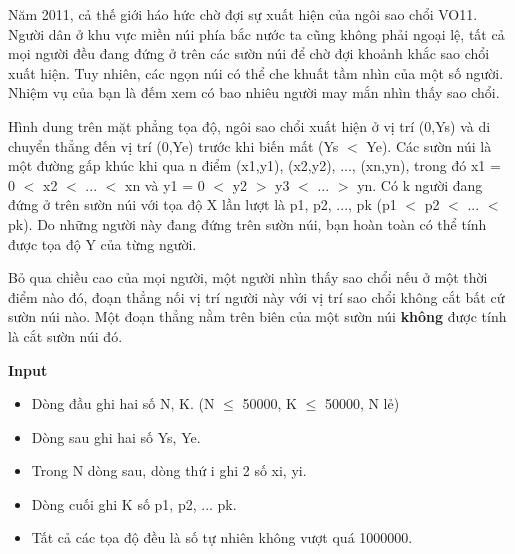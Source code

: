 Năm 2011, cả thế giới háo hức chờ đợi sự xuất hiện của ngôi sao chổi VO11. Người dân ở khu vực miền núi phía bắc nước ta cũng không phải ngoại lệ, tất cả mọi người đều đang đứng ở trên các sườn núi để chờ đợi khoảnh khắc sao chổi xuất hiện. Tuy nhiên, các ngọn núi có thể che khuất tầm nhìn của một số người. Nhiệm vụ của bạn là đếm xem có bao nhiêu người may mắn nhìn thấy sao chổi.

Hình dung trên mặt phẳng tọa độ, ngôi sao chổi xuất hiện ở vị trí (0,Ys) và di chuyển thẳng đến vị trí (0,Ye) trước khi biến mất (Ys $<$ Ye). Các sườn núi là một đường gấp khúc khi qua n điểm (x1,y1), (x2,y2), ..., (xn,yn), trong đó x1 = 0 $<$ x2 $<$ ... $<$ xn và y1 = 0 $<$ y2 $>$ y3 $<$ ... $>$ yn. Có k người đang đứng ở trên sườn núi với tọa độ X lần lượt là p1, p2, ..., pk (p1 $<$ p2 $<$ ... $<$ pk). Do những người này đang đứng trên sườn núi, bạn hoàn toàn có thể tính được tọa độ Y của từng người.

Bỏ qua chiều cao của mọi người, một người nhìn thấy sao chổi nếu ở một thời điểm nào đó, đoạn thẳng nối vị trí người này với vị trí sao chổi không cắt bất cứ sườn núi nào. Một đoạn thẳng nằm trên biên của một sườn núi \textbf{ không } được tính là cắt sườn núi đó.

\textbf{Input }
\begin{itemize}
	\item Dòng đầu ghi hai số N, K. (N  $\le$  50000, K  $\le$  50000, N lẻ)
	\item Dòng sau ghi hai số Ys, Ye.
	\item Trong N dòng sau, dòng thứ i ghi 2 số xi, yi.
	\item Dòng cuối ghi K số p1, p2, ... pk.
	\item Tất cả các tọa độ đều là số tự nhiên không vượt quá 1000000.
\end{itemize}